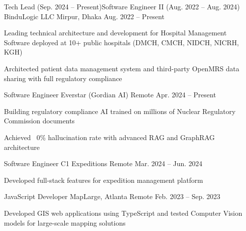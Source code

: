 

\begin{cventries}

  \cventry
    {Tech Lead (Sep. 2024 – Present)\enskip\textbar\enskip Software Engineer II (Aug. 2022 – Aug. 2024)}
    {BinduLogic LLC}
    {Mirpur, Dhaka}
    {Aug. 2022 – Present}
    {
      \begin{cvitems}
        \item {Leading technical architecture and development for Hospital Management Software deployed at 10+ public hospitals (DMCH, CMCH, NIDCH, NICRH, KGH)}
        \item {Architected patient data management system and third-party OpenMRS data sharing with full regulatory compliance}
      \end{cvitems}
    }

  \cventry
    {Software Engineer}
    {Everstar (Gordian AI)}
    {Remote}
    {Apr. 2024 – Present}
    {
      \begin{cvitems}
        \item {Building regulatory compliance AI trained on millions of Nuclear Regulatory Commission documents}
        \item {Achieved ~0\% hallucination rate with advanced RAG and GraphRAG architecture}
      \end{cvitems}
    }

  \cventry
    {Software Engineer}
    {C1 Expeditions}
    {Remote}
    {Mar. 2024 – Jun. 2024}
    {
      \begin{cvitems}
        \item {Developed full-stack features for expedition management platform}
      \end{cvitems}
    }

  \cventry
    {JavaScript Developer}
    {MapLarge, Atlanta}
    {Remote}
    {Feb. 2023 – Sep. 2023}
    {
      \begin{cvitems}
        \item {Developed GIS web applications using TypeScript and tested Computer Vision models for large-scale mapping solutions}
      \end{cvitems}
    }


\end{cventries}
